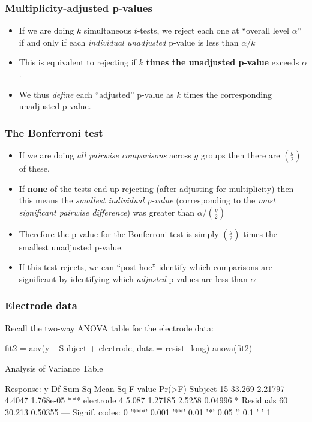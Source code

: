 \documentclass[a4paper]{article}
\begin{document}
\subsubsection{Multiplicity-adjusted p-values}
\begin{itemize}
	\item If we are doing \( k \) simultaneous \( t \)-tests, we reject each one at ``overall level \( \alpha \)'' if and only if each \textit{individual unadjusted} p-value is less than \( \alpha / k \)
	\item This is equivalent to rejecting if \( k \) \textbf{times the unadjusted p-value} exceeds \( \alpha \).
	\item We thus \textit{define} each ``adjusted'' p-value as \( k \) times the corresponding unadjusted p-value.
\end{itemize}
\subsubsection{The Bonferroni test}
\begin{itemize}
	\item If we are doing \textit{all pairwise comparisons} across \( g \) groups then there are \( \binom{g}{2} \) of these.
	\item If \textbf{none} of the tests end up rejecting (after adjusting for multiplicity) then this means the \textit{smallest individual p-value} (corresponding to the \textit{most significant pairwise difference}) was greater than \( \alpha / \binom{g}{2} \) 
	\item Therefore the p-value for the Bonferroni test is simply \( \binom{g}{2} \) times the smallest unadjusted p-value.
	\item If this test rejects, we can ``post hoc'' identify which comparisons are significant by identifying which \textit{adjusted} p-values are less than \( \alpha \) 
\end{itemize}
\subsubsection{Electrode data}
Recall the two-way ANOVA table for the electrode data:
\begin{Schunk}
\begin{Sinput}
fit2 = aov(y ~ Subject + electrode, data = resist_long)
anova(fit2)
\end{Sinput}
\begin{Soutput}
Analysis of Variance Table

Response: y
          Df Sum Sq Mean Sq F value    Pr(>F)    
Subject   15 33.269 2.21797  4.4047 1.768e-05 ***
electrode  4  5.087 1.27185  2.5258   0.04996 *  
Residuals 60 30.213 0.50355                      
---
Signif. codes:  0 '***' 0.001 '**' 0.01 '*' 0.05 '.' 0.1 ' ' 1
\end{Soutput}
\end{Schunk}
\end{document}
